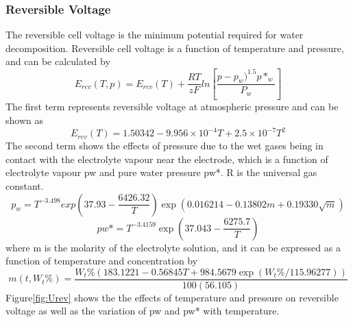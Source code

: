 \subsubsection{Reversible Voltage} 
The reversible cell voltage is the minimum potential required for water decomposition. Reversible cell voltage is a function of temperature and pressure, and can be calculated by
\begin{equation} 
E_{rev}(T,p)=E_{rev}(T) + \frac{RT} {zF}ln[\frac{p-p_w)^{1.5}p*_w} {P_w} ]
\end{equation} 
The first term represents reversible voltage at atmospheric pressure and can be shown as
\begin{equation} 
E_{rev}(T)=1.50342-9.956 \times 10^{-4}T+2.5 \times10^{-7}T^2
\end{equation} 
 The second term shows the effects of pressure due to the wet gases being in contact with the electrolyte vapour near the electrode, which is a function of electrolyte vapour pw and pure water pressure pw*. R is the universal gas constant.
 \begin{equation} 
p_w=T^{-3.498} exp(37.93-\frac{6426.32} {T} )\exp(0.016214 - 0.13802m+0.19330\sqrt{m} ) 
\end{equation} 
\begin{equation}
pw*=T^{-3.4159} \exp(37.043-\frac{6275.7} {T} ) 
\end{equation} 
where m is the molarity of the electrolyte solution, and it can be expressed as a function of temperature and  concentration by
\begin{equation} 
m(t, W_t\%) =\frac{W_t\%(183.1221-0.56845T+984.5679 \exp(W_t\%/115.96277))} {100(56.105)} 
\end{equation} 
Figure\ref{fig:Urev} shows the the effects of temperature and pressure on reversible voltage as well as the variation of pw and pw* with temperature. 

